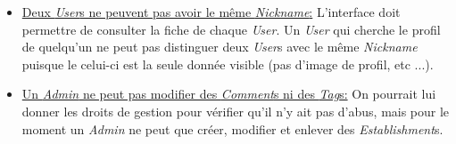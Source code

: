 \documentclass[11pt,a4paper]{report}
\begin{document}
\begin{itemize}
\item \underline{Deux \textit{User}s ne peuvent pas avoir le même \textit{Nickname}:} L'interface doit permettre de consulter la fiche de chaque \textit{User}. Un \textit{User} qui cherche le profil de quelqu'un ne peut pas distinguer deux \textit{User}s avec le même \textit{Nickname} puisque le celui-ci est la seule donnée visible (pas d'image de profil, etc ...).
\item \underline{Un \textit{Admin} ne peut pas modifier des \textit{Comment}s ni des \textit{Tag}s:} On pourrait lui donner les droits de gestion pour vérifier qu'il n'y ait pas d'abus, mais pour le moment un \textit{Admin} ne peut que créer, modifier et enlever des \textit{Establishment}s.
\end{itemize}
\end{document}
